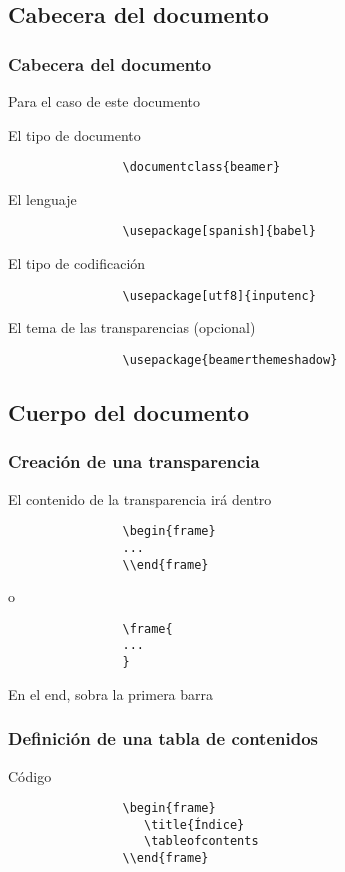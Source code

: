 \documentclass{beamer}
\begin{document}
\subsection{Cabecera del documento}
	\begin{frame}[fragile]
		\frametitle{Cabecera del documento}
		Para el caso de este documento
		\begin{block}{El tipo de documento}
			\begin{verbatim}
				\documentclass{beamer}
			\end{verbatim}
		\end{block}
		\begin{block}{El lenguaje}
			\begin{verbatim}	
				\usepackage[spanish]{babel}
			\end{verbatim}
		\end{block}
		\begin{block}{El tipo de codificación}
			\begin{verbatim}
				\usepackage[utf8]{inputenc}
			\end{verbatim}
		\end{block}
		\begin{block}{El tema de las transparencias (opcional)}
			\begin{verbatim}
				\usepackage{beamerthemeshadow}
			\end{verbatim}
		\end{block}
	\end{frame}
	
\subsection{Cuerpo del documento}
	\begin{frame}[fragile]
		\frametitle{Creación de una transparencia}
		\begin{block}{El contenido de la transparencia irá dentro}
			\begin{verbatim}
				\begin{frame}
				...
				\\end{frame}
			\end{verbatim}
			o
			\begin{verbatim}
				\frame{
				...
				}
			\end{verbatim}
			\alert{En el end, sobra la primera barra}
		\end{block}
	\end{frame}
	
	\begin{frame}[fragile]
		\frametitle{Definición de una tabla de contenidos}
		\begin{block}{Código}
			\begin{verbatim}
				\begin{frame}
				   \title{Índice}
				   \tableofcontents
				\\end{frame}
			\end{verbatim}
		\end{block}
	\end{frame}
	
\end{document}
